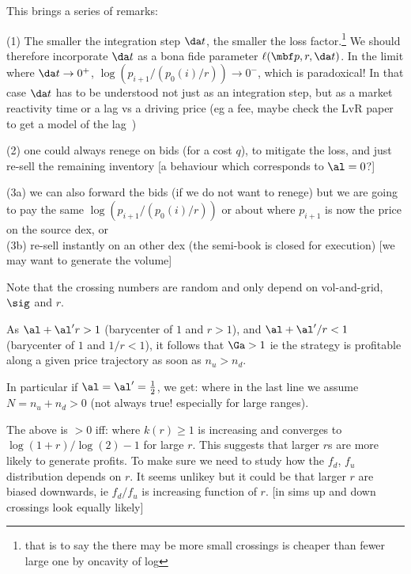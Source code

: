 \documentclass[oneside,12pt]{article}
\begin{document}
This brings a series of remarks:

(1) The smaller the integration step $\da t$, the smaller the loss factor.\footnote{that is to say the
there may be more small crossings is cheaper than fewer large one by oncavity of log}
We should therefore incorporate $\da t$ as a bona fide parameter $\ell(\mbf p, r,\da t)$.
In the limit where $\da t\to0^+$, $\log(p_{i+1}/(p_0(i)/r))\to 0^-$, which is paradoxical!
In that case $\da t$ has to be understood not just as an integration step,
but as a market reactivity time or a lag vs a driving price 
(eg a fee, maybe check the LvR paper to get a model of the lag~\cite{milionis2022automated})

(2) one could always renege on bids (for a cost $q$), to mitigate the loss, 
and just re-sell the remaining inventory [a behaviour which corresponds to $\al=0$?]

(3a) we can also forward the bids (if we do not want to renege) but we are going to pay the same
$\log(p_{i+1}/(p_0(i)/r))$ or about where $p_{i+1}$ is now the price on the source dex, or 
\\(3b) re-sell instantly on an other dex (the semi-book is closed for execution) 
[we may want to generate the volume]


Note that the crossing numbers are random and only depend on vol-and-grid, $\sig$ and $r$.

As
$\al+\al' r>1$ (barycenter of $1$ and $r>1$), and  
$\al+\al'/r<1$ (barycenter of $1$ and $1/r<1$),
it follows that $\Ga>1$ ie the strategy is profitable along a given price trajectory as soon as $n_u>n_d$.

In particular if $\al=\al'=\frac12$, we get:
where in the last line we assume $N=n_u+n_d>0$ (not always true! especially for large ranges).

The above is $>0$ iff:
where $k(r)\geq 1$ is increasing and converges to $\log(1+r)/\log(2) -1$ for large $r$.
This suggests that  larger $r$s are more likely to generate profits. To make sure we need
to study how the $f_d$, $f_u$ distribution depends on $r$. It seems unlikey but it could be that larger $r$ are biased 
downwards, ie $f_d/f_u$ is increasing function of $r$. [in sims up and down crossings 
look equally likely]
\end{document}
